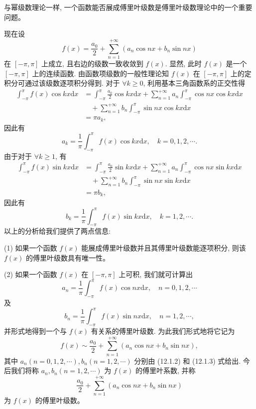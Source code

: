 \documentclass[UTF8, 12pt, fontset=fandol, oneside]{ctexart}
\begin{document}
与幂级数理论一样, 一个函数能否展成傅里叶级数是傅里叶级数理论中的一个重要问题。

现在设
\[
  f(x)=\frac{a_0}{2}+\sum_{n=1}^{+\infty}(a_n\cos nx+b_n\sin nx)
\]
在 $[-\pi,\pi]$ 上成立, 且右边的级数一致收敛到 $f(x)$. 显然, 此时 $f(x)$ 是一个 $[-\pi,\pi]$ 上的连续函数. 由函数项级数的一般性理论知 $f(x)$ 在 $[-\pi,\pi]$ 上的定积分可通过该级数逐项积分得到. 对于 $\forall k\geqslant0$, 利用基本三角函数系的正交性得
\[
\begin{aligned}
  \int_{-\pi}^{\pi}f(x)\cos kx\mathrm dx
  &=\int_{-\pi}^{\pi}\frac{a_0}{2}\cos kx\mathrm dx
    +\sum_{n=1}^{+\infty}a_n\int_{-\pi}^{\pi}\cos nx\cos kx\mathrm dx \\
  &\quad+\sum_{n=1}^{+\infty}b_n\int_{-\pi}^{\pi}\sin nx\cos kx\mathrm dx \\
  &=\pi a_k,
\end{aligned}
\]
因此有
\[
  a_k=\frac1\pi\int_{-\pi}^{\pi}f(x)\cos kx\mathrm dx,\quad k=0,1,2,\cdots.
\]
由于对于 $\forall k\geqslant1$, 有
\[
\begin{aligned}
  \int_{-\pi}^{\pi}f(x)\sin kx\mathrm dx
  &=\int_{-\pi}^{\pi}\frac{a_0}{2}\sin kx\mathrm dx
    +\sum_{n=1}^{+\infty}a_n\int_{-\pi}^{\pi}\cos nx\sin kx\mathrm dx \\
  &\quad+\sum_{n=1}^{+\infty}b_n\int_{-\pi}^{\pi}\sin nx\sin kx\mathrm dx \\
  &=\pi b_k,
\end{aligned}
\]
因此有
\[
  b_k=\frac1\pi\int_{-\pi}^{\pi}f(x)\sin kx\mathrm dx,\quad k=1,2,\cdots.
\]
以上的分析给我们提供了两点信息:

(1) 如果一个函数 $f(x)$ 能展成傅里叶级数并且其傅里叶级数能逐项积分, 则该 $f(x)$ 的傅里叶级数具有唯一性。

(2) 如果一个函数 $f(x)$ 在 $[-\pi,\pi]$ 上可积, 我们就可计算出
\begin{equation}
  a_n=\frac1\pi\int_{-\pi}^{\pi}f(x)\cos nx\mathrm dx,\quad n=0,1,2,\cdots
  \tag{12.1.2}
\end{equation}
及
\begin{equation}
  b_n=\frac1\pi\int_{-\pi}^{\pi}f(x)\sin nx\mathrm dx,\quad n=1,2,\cdots,
  \tag{12.1.3}
\end{equation}
并形式地得到一个与 $f(x)$ 有关系的傅里叶级数. 为此我们形式地将它记为
\begin{equation}
  f(x)\sim\frac{a_0}{2}+\sum_{n=1}^{+\infty}(a_n\cos nx+b_n\sin nx),
  \tag{12.1.4}
\end{equation}
其中 $a_n(n=0,1,2,\cdots), b_n(n=1,2,\cdots)$ 分别由 (12.1.2) 和 (12.1.3) 式给出. 今后我们将称 $a_n,b_n(n=1,2,\cdots)$ 为 $f(x)$ 的傅里叶系数, 并称
\[
  \frac{a_0}{2}+\sum_{n=1}^{+\infty}(a_n\cos nx+b_n\sin nx)
\]
为 $f(x)$ 的傅里叶级数。
\end{document}
